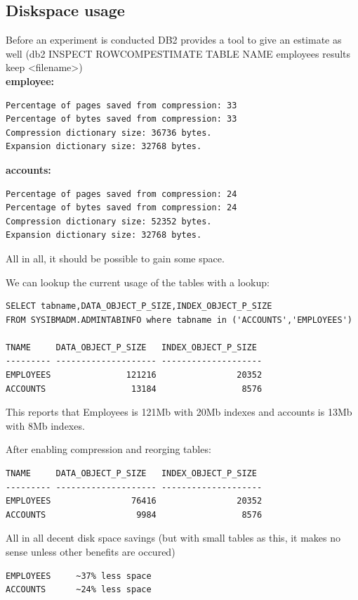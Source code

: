 \subsection{Diskspace usage}
Before an experiment is conducted DB2 provides a tool to give an estimate as
well (db2 INSPECT ROWCOMPESTIMATE TABLE NAME employees results keep
<filename>)\\

\textbf{employee:}\\
\begin{verbatim}
Percentage of pages saved from compression: 33
Percentage of bytes saved from compression: 33
Compression dictionary size: 36736 bytes.
Expansion dictionary size: 32768 bytes.
\end{verbatim}

\textbf{accounts:}\\
\begin{verbatim}
Percentage of pages saved from compression: 24
Percentage of bytes saved from compression: 24
Compression dictionary size: 52352 bytes.
Expansion dictionary size: 32768 bytes.
\end{verbatim}

All in all, it should be possible to gain some space.

We can lookup the current usage of the tables with a lookup:
\begin{verbatim}
SELECT tabname,DATA_OBJECT_P_SIZE,INDEX_OBJECT_P_SIZE 
FROM SYSIBMADM.ADMINTABINFO where tabname in ('ACCOUNTS','EMPLOYEES')

TNAME     DATA_OBJECT_P_SIZE   INDEX_OBJECT_P_SIZE 
--------- -------------------- --------------------
EMPLOYEES               121216                20352
ACCOUNTS                 13184                 8576
\end{verbatim}

This reports that Employees is 121Mb with 20Mb indexes and accounts is 13Mb with 8Mb indexes.

After enabling compression and reorging tables:
\begin{verbatim}
TNAME     DATA_OBJECT_P_SIZE   INDEX_OBJECT_P_SIZE 
--------- -------------------- --------------------
EMPLOYEES                76416                20352
ACCOUNTS                  9984                 8576
\end{verbatim}
All in all decent disk space savings (but with small tables as this, it makes no
sense unless other benefits are occured)
\begin{verbatim}
EMPLOYEES     ~37% less space
ACCOUNTS      ~24% less space 
\end{verbatim}

